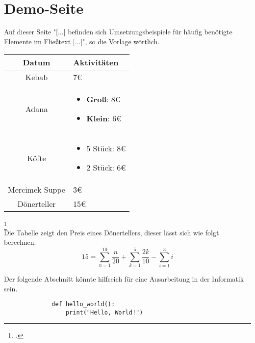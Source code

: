 \section{Demo-Seite}
Auf dieser Seite "[...] befinden sich Umsetzungsbeispiele für häufig benötigte Elemente im Fließtext [...]", so die Vorlage w\"ortlich. \\

\begin{center}
    \begin{table}[h]
    \centering
    \begin{tabular}{|c|p{6cm}|}
        \hline
        \textbf{Datum} & \textbf{Aktivitäten} \\
        \hline
        Kebab & 7€ \\
        \hline
        Adana & \begin{itemize}
            \item \textbf{Groß}: 8€
            \item \textbf{Klein}: 6€
        \end{itemize} \\
        \hline
        Köfte & \begin{itemize}
            \item 5 Stück: 8€
            \item 2 Stück: 6€
        \end{itemize}\\
        \hline
        Mercimek Suppe & 3€ \\
        \hline
        Dönerteller & 15€ \\
        \hline
    \end{tabular}
    \label{tab:example}
    \end{table}
\end{center}
\footcitetext[Vgl.][]{DemoQuelle}\\ [-4em]

Die Tabelle zeigt den Preis eines Dönertellers, dieser lässt sich wie folgt berechnen:
\begin{equation}
    15 = \sum_{n=1}^{10} \frac{n}{20} + \sum_{k=1}^{5} \frac{2k}{10} - \sum_{i=1}^{3} i
\end{equation}

\newpage
Der folgende Abschnitt könnte hilfreich für eine Ausarbeitung in der Informatik sein.
\begin{figure}[h]
    \begin{lstlisting}
        def hello_world():
            print("Hello, World!")
    \end{lstlisting}
    \label{fig:meincode}
\end{figure}

